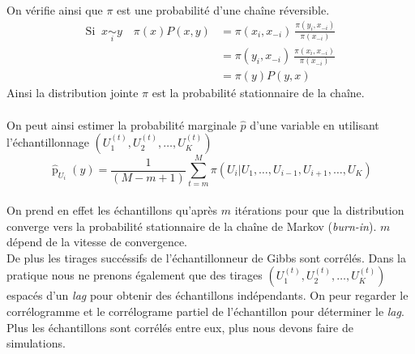 \documentclass{article}
\theoremstyle{definition}
\theoremstyle{remark}
\begin{document}
{\paragraph{}
On vérifie ainsi que $\pi$ est une probabilité d'une chaîne réversible.
$$
\begin{aligned}
	\text{Si } \ x \underset{i}{\sim} y \quad \pi(x) P(x,y) &= \pi(x_i,x_{-i})\ \frac{\pi(y_i, x_{-i})}{\pi(x_{-i})}  \\
	& = \pi(y_i,x_{-i})\ \frac{\pi(x_i, x_{-i})}{\pi(x_{-i})} \\ 
	&= \pi(y) P(y,x) 
\end{aligned}
$$
Ainsi la distribution jointe $\pi$ est la probabilité stationnaire de la chaîne.

\paragraph{}
On peut ainsi estimer la probabilité marginale $\hat{p}$ d'une variable en utilisant l'échantillonnage $(U_1^{(t)},U_2^{(t)},\ldots,U_K^{(t)})$ 
\[
\widehat{\operatorname{p}}_{U_{i}}(y)= \frac{1}
	{(M-m+1)} \sum_{t=m}^{M} \pi (U_i | U_1, \ldots, U_{i-1}, U_{i+1}, \ldots, U_K)
\]
\paragraph{}

On prend en effet les échantillons qu'après $m$ itérations pour que la distribution converge vers la probabilité stationnaire 
de la chaîne de Markov (\textit{burn-in}). $m$ dépend de la vitesse de convergence.\\

De plus les tirages succéssifs de l'échantillonneur de Gibbs sont corrélés. Dans la pratique nous ne prenons également que des tirages  
$\left(U_{1}^{(t)}, U_{2}^{(t)}, \ldots, U_{K}^{(t)}\right)$ espacés d'un \textit{lag} pour obtenir des échantillons indépendants.
On peur regarder le corrélogramme et le corrélograme partiel de l'échantillon pour déterminer le \textit{lag}. \\
Plus les échantillons sont corrélés entre eux, plus nous devons faire de simulations. 
}
\end{document}
